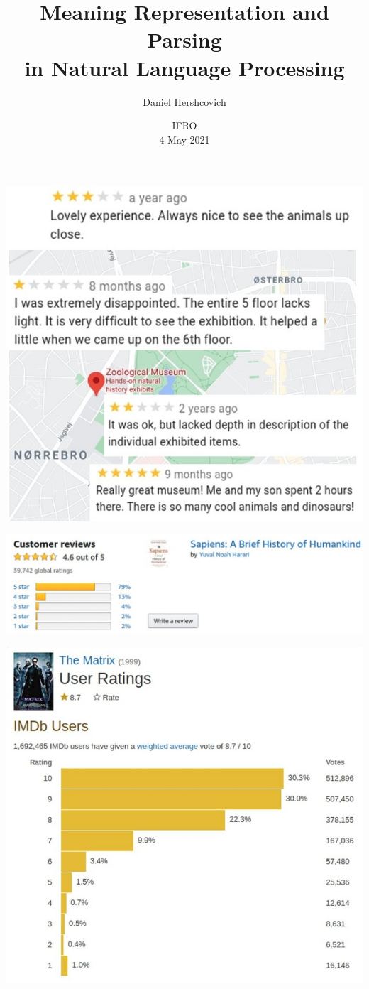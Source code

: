 \documentclass[t,xcolor={svgnames,table}]{beamer}
\begin{document}
\title[]{Meaning Representation and Parsing \\ in Natural Language Processing}
\author{Daniel Hershcovich}
\date{IFRO \\ 4 May 2021}

\begin{frame}
\titlepage
\end{frame}

\begin{frame}
\includegraphics[width=.7\textwidth]{reviews}

\pause
\vspace{-3cm}
\includegraphics[width=\textwidth]{amazon}

\pause
\vspace{-7cm}
\hfill\includegraphics[width=.5\textwidth]{imdb}
\end{frame}
\end{document}
